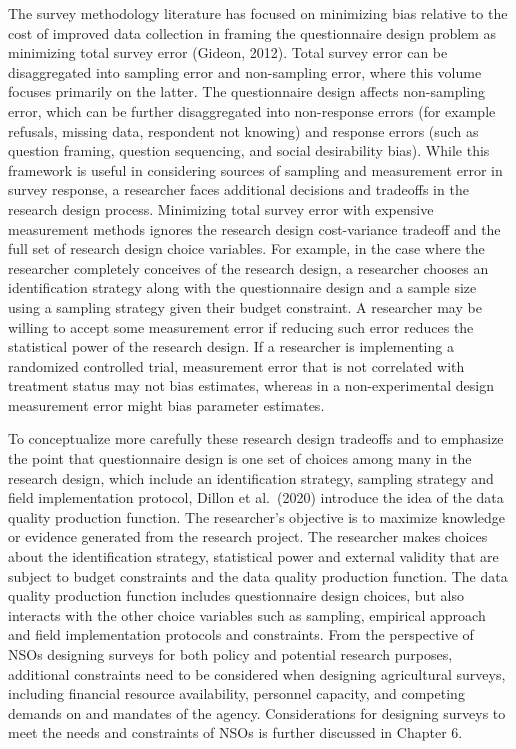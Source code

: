 \documentclass[
]{book}
\begin{document}
The survey methodology literature has focused on minimizing bias relative to the cost of improved data collection in framing the questionnaire design problem as minimizing total survey error (Gideon, 2012). Total survey error can be disaggregated into sampling error and non-sampling error, where this volume focuses primarily on the latter. The questionnaire design affects non-sampling error, which can be further disaggregated into non-response errors (for example refusals, missing data, respondent not knowing) and response errors (such as question framing, question sequencing, and social desirability bias). While this framework is useful in considering sources of sampling and measurement error in survey response, a researcher faces additional decisions and tradeoffs in the research design process. Minimizing total survey error with expensive measurement methods ignores the research design cost-variance tradeoff and the full set of research design choice variables. For example, in the case where the researcher completely conceives of the research design, a researcher chooses an identification strategy along with the questionnaire design and a sample size using a sampling strategy given their budget constraint. A researcher may be willing to accept some measurement error if reducing such error reduces the statistical power of the research design. If a researcher is implementing a randomized controlled trial, measurement error that is not correlated with treatment status may not bias estimates, whereas in a non-experimental design measurement error might bias parameter estimates.

To conceptualize more carefully these research design tradeoffs and to emphasize the point that questionnaire design is one set of choices among many in the research design, which include an identification strategy, sampling strategy and field implementation protocol, Dillon et al.~(2020) introduce the idea of the data quality production function. The researcher's objective is to maximize knowledge or evidence generated from the research project. The researcher makes choices about the identification strategy, statistical power and external validity that are subject to budget constraints and the data quality production function. The data quality production function includes questionnaire design choices, but also interacts with the other choice variables such as sampling, empirical approach and field implementation protocols and constraints. From the perspective of NSOs designing surveys for both policy and potential research purposes, additional constraints need to be considered when designing agricultural surveys, including financial resource availability, personnel capacity, and competing demands on and mandates of the agency. Considerations for designing surveys to meet the needs and constraints of NSOs is further discussed in Chapter 6.
\end{document}
